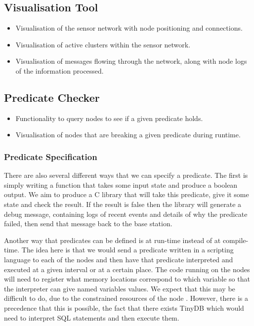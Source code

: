 \documentclass[a4paper]{article}
\begin{document}
\subsection{Visualisation Tool}
\begin{itemize}
	\item Visualisation of the sensor network with node positioning and connections.
	\item Visualisation of active clusters within the sensor network.
	\item Visualisation of messages flowing through the network, along with node logs of the information processed.
\end{itemize}

\subsection{Predicate Checker}
\begin{itemize}
	\item Functionality to query nodes to see if a given predicate holds.
	\item Visualisation of nodes that are breaking a given predicate during runtime.
\end{itemize}

\subsubsection{Predicate Specification}

There are also several different ways that we can specify a predicate. The first is simply writing a function that takes some input state and produce a boolean output. We aim to produce a C library that will take this predicate, give it some state and check the result. If the result is false then the library will generate a debug message, containing logs of recent events and details of why the predicate failed, then send that message back to the base station.

Another way that predicates can be defined is at run-time instead of at compile-time. The idea here is that we would send a predicate written in a scripting language to each of the nodes and then have that predicate interpreted and executed at a given interval or at a certain place. The code running on the nodes will need to register what memory locations correspond to which variable so that the interpreter can give named variables values. We expect that this may be difficult to do, due to the constrained resources of the node \cite{CM5000}. However, there is a precedence that this is possible, the fact that there exists TinyDB \cite{?} which would need to interpret SQL statements and then execute them.
\end{document}
